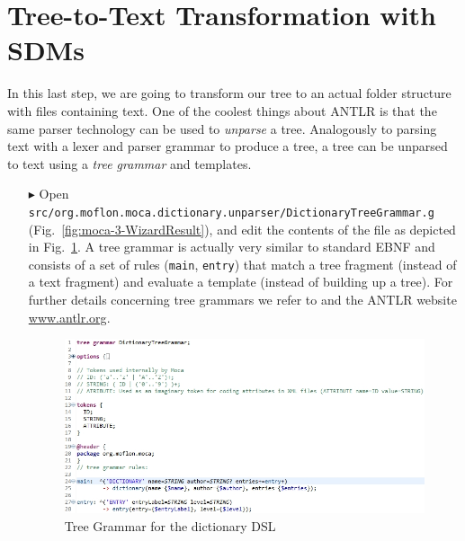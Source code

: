 \section{Tree-to-Text Transformation with SDMs}
\label{chap:tree-to-text}

In this last step, we are going to transform our tree to an actual folder structure with files containing text.
One of the coolest things about ANTLR is that the same parser technology can be used to \emph{unparse} a tree.
Analogously to parsing text with a lexer and parser grammar to produce a tree, a tree can be unparsed to text using a \emph{tree grammar} and templates.
\begin{enumerate}
\item[$\blacktriangleright$] Open \texttt{src/org.moflon.moca.dictionary.unparser/Dictionary\-Tree\-Grammar.g} (Fig.~\ref{fig:moca-3-WizardResult}), and edit the contents of the file as depicted in Fig.~\ref{fig:moca-DictionaryTreeGrammar}.
A tree grammar is actually very similar to standard EBNF and consists of a set of rules (\texttt{main}, \texttt{entry}) that match a tree fragment (instead of a text fragment) and evaluate a template (instead of building up a tree).
For further details concerning tree grammars we refer to \cite{ANTLR} and the
ANTLR website \url{www.antlr.org}.

\begin{figure}[!htbp]
\begin{center}
 \includegraphics[width=\textwidth]{pics/moca/5MocaTreeToText/DictionaryTreeGrammar}
  \caption{Tree Grammar for the dictionary DSL} 
  \label{fig:moca-DictionaryTreeGrammar}
\end{center}
\end{figure} 


\end{enumerate}
